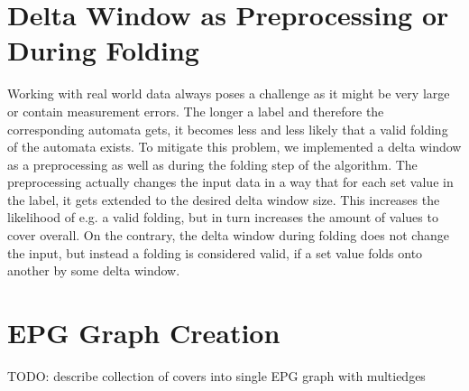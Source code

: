 \section{Delta Window as Preprocessing or During Folding}
\label{ch:novel-algos:delta-window}
Working with real world data always poses a challenge as it might be very large or contain measurement errors. The longer a label and therefore the corresponding automata gets, it becomes less and less likely that a valid folding of the automata exists. To mitigate this problem, we implemented a delta window as a preprocessing as well as during the folding step of the algorithm. The preprocessing actually changes the input data in a way that for each set value in the label, it gets extended to the desired delta window size. This increases the likelihood of e.g. a valid folding, but in turn increases the amount of values to cover overall. On the contrary, the delta window during folding does not change the input, but instead a folding is considered valid, if a set value folds onto another by some delta window.

\section{EPG Graph Creation}
\label{ch:novel-algos:ept-graph}
TODO: describe collection of covers into single EPG graph with multiedges
